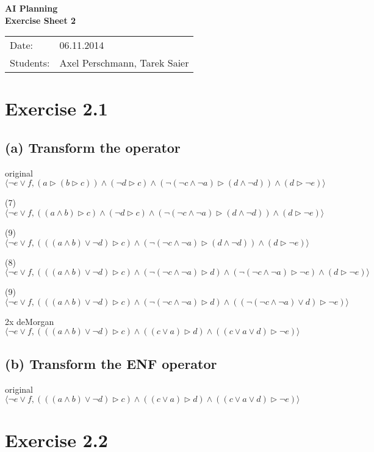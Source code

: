 \documentclass[11pt,a4paper]{article}
\begin{document}
\begin{center}
\Huge{\textbf{AI Planning}}\\
\LARGE{\textbf{Exercise Sheet 2}}
\end{center}
\vspace{2cm}
\begin{tabular}{ll}
Date: & 06.11.2014\\
Students: & Axel Perschmann, Tarek Saier
\end{tabular}

\section*{Exercise 2.1}
\subsection*{(a) Transform the operator}

original \newline
$ \langle
    \neg e \lor f ,
  (a \triangleright ( b \triangleright c))   \land
  (\neg d \triangleright c)  \land
  ( \neg (\neg c \land \neg a) \triangleright (d \land \neg d) )   \land
  (d \triangleright \neg e)  
  \rangle
$

(7) \newline
$ \langle
    \neg e \lor f ,
  ((a \land b) \triangleright c)   \land
  (\neg d \triangleright c)  \land
  ( \neg (\neg c \land \neg a) \triangleright (d \land \neg d) )   \land
  (d \triangleright \neg e)  
  \rangle
$

(9) \newline
$ \langle
    \neg e \lor f ,
  (((a \land b) \lor \neg d) \triangleright c)  \land
  ( \neg (\neg c \land \neg a) \triangleright (d \land \neg d) )   \land
  (d \triangleright \neg e)  
  \rangle
$

(8) \newline
$ \langle
    \neg e \lor f ,
  (((a \land b) \lor \neg d) \triangleright c)  \land
  ( \neg (\neg c \land \neg a) \triangleright d )   \land
  ( \neg (\neg c \land \neg a) \triangleright \neg e )   \land
  (d \triangleright \neg e)  
  \rangle
$

(9) \newline
$ \langle
    \neg e \lor f ,
  (((a \land b) \lor \neg d) \triangleright c)  \land
  ( \neg (\neg c \land \neg a) \triangleright d )   \land
  (( \neg (\neg c \land \neg a) \lor d) \triangleright \neg e)  
  \rangle
$

2x deMorgan \newline
$ \langle
    \neg e \lor f ,
  (((a \land b) \lor \neg d) \triangleright c)  \land
  (( c \lor a) \triangleright d )   \land
  (( c \lor a \lor d) \triangleright \neg e)
  \rangle  
$

\subsection*{(b) Transform the ENF operator}
original \newline
$ \langle
    \neg e \lor f ,
  (((a \land b) \lor \neg d) \triangleright c)   \land
  ((c \lor a) \triangleright d)  \land
  (( c \lor a \lor d) \triangleright \neg e)
  \rangle
$

\section*{Exercise 2.2}
\end{document}
